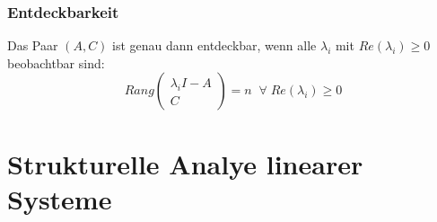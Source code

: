 \documentclass[a4paper,twocolumn,10pt]{article}
\begin{document}
\subsubsection{Entdeckbarkeit}
Das Paar $(A,C)$ ist genau dann entdeckbar, wenn alle $\lambda_i$ mit $Re(\lambda_i)\geq 0$ beobachtbar sind:
\begin{equation*}
Rang\begin{pmatrix}\lambda_i I-A \\ C\end{pmatrix}=n\;\;\forall\;Re(\lambda_i)\geq 0
\end{equation*}

\section{Strukturelle Analye linearer Systeme}
\end{document}
